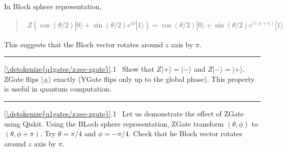 \documentclass[letterpaper,10pt,english]{jupyterBook}
\begin{document}
\sphinxAtStartPar
In Bloch sphere representation,
\begin{quote}
\begin{equation*}
\begin{split}
Z \left( \cos(\theta/2)|0\rangle + \sin(\theta/2) e^{i\phi}|1\rangle\right) = \cos(\theta/2) |0\rangle + \sin(\theta/2) e^{i (\phi+\pi)} |1\rangle
\end{split}
\end{equation*}\end{quote}

\sphinxAtStartPar
This suggests that the Bloch vector rotates around \(z\) axis by \(\pi\).


\bigskip\hrule\bigskip


\sphinxAtStartPar
{} \hyperref[\detokenize{q1gates/z:sec-zgate}]{\ref{\detokenize{q1gates/z:sec-zgate}}}.1   Show that \(Z|+\rangle = |-\rangle\) and \(Z|-\rangle = |+\rangle\). ZGate flips \(|\pm\rangle\) exactly (YGate flips only up to the global phase).  This property is useful in quantum computation.


\bigskip\hrule\bigskip


\sphinxAtStartPar
{} \hyperref[\detokenize{q1gates/z:sec-zgate}]{\ref{\detokenize{q1gates/z:sec-zgate}}}.1   Let us demonstrate the effect of ZGate using Qiskit.  Using the BLoch sphere representation, ZGate transform \((\theta,\phi)\) to \((\theta,\phi+\pi)\).  Try \(\theta=\pi/4\) and \(\phi=-\pi/4\).  Check that he Bloch vector rotates around \(z\) axis by \(\pi\).
\end{document}
